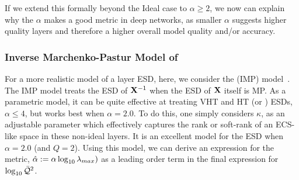 If we extend this formally beyond the Ideal  case to $\alpha\ge 2$, we now can explain why the \HTSR $\alpha$
makes a good \LayerQuality metric in deep networks,
as smaller $\alpha$ suggests higher quality layers and therefore a higher overall model quality and/or accuracy. 


\subsubsection{Inverse Marchenko-Pastur Model of \IdealLearning}
For a more realistic model of a layer ESD, 
here, we consider the \InverseMP (IMP) model~\cite{BunThesis}.
The IMP model treats the ESD of $\mathbf{X}^{-1}$ when the ESD of $\mathbf{X}$ itself is MP.
As a parametric model, it can be quite effective at treating VHT and HT (or \FatTailed) ESDs,
$\alpha\le 4$, but works best when $\alpha=2.0$.
To do this, one simply considers  $\kappa$,  as an adjustable parameter which effectively captures the rank or soft-rank of an ECS-like space in these non-ideal layers.
%
It is an excellent model for the ESD when $\alpha=2.0$ (and $Q=2$).
Using this model, we can derive an expression for the \HTSR \ALPHAHAT \LayerQuality metric,
$\hat\alpha :=\alpha\log_{10}\lambda_{max})$ as a leading order term in the final expression for $\log_{10}\bar{\mathcal{Q}}^{2}$.

